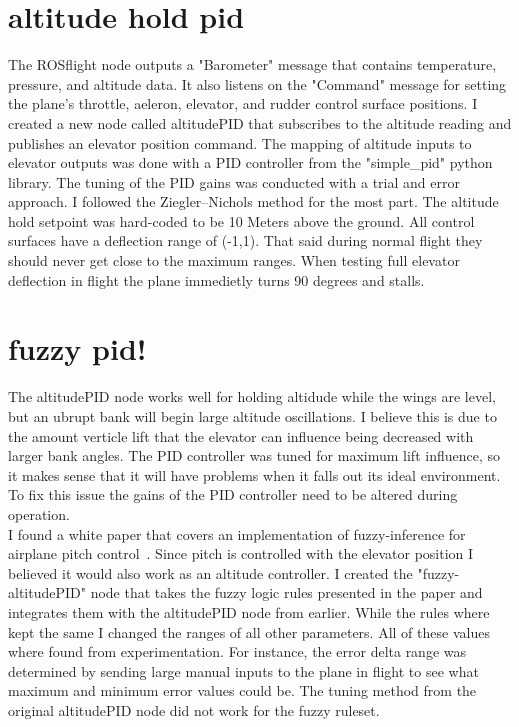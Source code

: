 \documentclass[11pt]{scrartcl} %
\begin{document}
\section{altitude hold pid}
The ROSflight node outputs a "Barometer" message that contains temperature, pressure, and altitude data. It also listens on the "Command" message for setting the plane's throttle, aeleron, elevator, and rudder control surface positions. I created a new node called altitudePID that subscribes to the altitude reading and publishes an elevator position command. The mapping of altitude inputs to elevator outputs was done with a PID controller from the "simple\_pid" python library. The tuning of the PID gains was conducted with a trial and error approach. I followed the Ziegler–Nichols method for the most part. The altitude hold setpoint was hard-coded to be 10 Meters above the ground. All control surfaces have a deflection range of (-1,1). That said during normal flight they should never get close to the maximum ranges. When testing full elevator deflection in flight the plane immedietly turns 90 degrees and stalls.

\section{fuzzy pid!}
The altitudePID node works well for holding altidude while the wings are level, but an ubrupt bank will begin large altitude oscillations. I believe this is due to the amount verticle lift that the elevator can influence being decreased with larger bank angles. The PID controller was tuned for maximum lift influence, so it makes sense that it will have problems when it falls out its ideal environment. To fix this issue the gains of the PID controller need to be altered during operation.  
\\

I found a white paper that covers an implementation of fuzzy-inference for airplane pitch control~\cite{fuzzy}. Since pitch is controlled with the elevator position I believed it would also work as an altitude controller. I created the "fuzzy-altitudePID" node that takes the fuzzy logic rules presented in the paper and integrates them with the altitudePID node from earlier. While the rules where kept the same I changed the ranges of all other parameters. All of these values where found from experimentation. For instance, the error delta range was determined by sending large manual inputs to the plane in flight to see what maximum and minimum error values could be. The tuning method from the original altitudePID node did not work for the fuzzy ruleset. 
\end{document}
